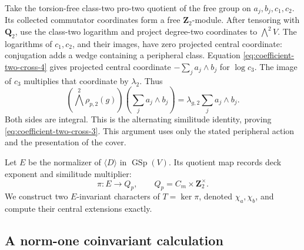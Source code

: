 Take the torsion-free class-two pro-two quotient of the
free group on \(a_j,b_j,c_1,c_2\). Its collected
commutator coordinates form a free \(\mathbf Z_2\)-module.
After tensoring with \(\mathbf Q_2\), use the class-two
logarithm and project degree-two coordinates to
\(\bigwedge^2 V\). The logarithms of \(c_1,c_2\), and
their images, have zero projected central coordinate:
conjugation adds a wedge containing a peripheral class.
Equation \eqref{eq:coefficient-two-cross-4} gives projected central coordinate
\(-\sum_j a_j\wedge b_j\) for \(\log c_3\).
The image of \(c_3\) multiplies that coordinate by
\(\lambda_2\). Thus
\[
     (\bigwedge^2\rho_{p,2}(g))
          \left(\sum_j a_j\wedge b_j\right)
       =\lambda_{g,2}\sum_j a_j\wedge b_j.
\]
Both sides are integral. This is the alternating
similitude identity, proving \eqref{eq:coefficient-two-cross-3}. This argument uses
only the stated peripheral action and the presentation
of the cover.

Let \(E\) be the normalizer of \(\langle D\rangle\)
in \(\operatorname{GSp}(V)\). Its quotient map records
deck exponent and similitude multiplier:
\begin{equation}
 \pi:E\longrightarrow Q_p,
       \qquad Q_p=C_m\times\mathbf Z_2^\times.
                                                        \label{eq:coefficient-two-cross-5}
\end{equation}
We construct two \(E\)-invariant characters of
\(T=\ker\pi\), denoted \(\chi_a,\chi_b\), and compute
their central extensions exactly.

\subsection{A norm-one coinvariant calculation}

